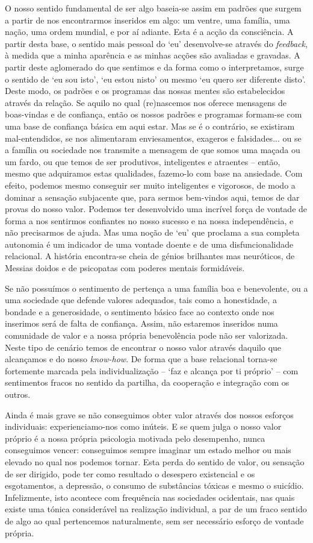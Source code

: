 O nosso sentido fundamental de ser algo baseia-se assim em padrões que surgem a partir de nos encontrarmos inseridos em algo: um ventre, uma família, uma nação, uma ordem mundial, e por aí adiante. Esta é a acção da consciência. A partir desta base, o sentido mais pessoal do `eu' desenvolve-se através do \emph{feedback}, à medida que a minha aparência e as minhas acções são avaliadas e gravadas. A partir deste aglomerado do que sentimos e da forma como o interpretamos, surge o sentido de `eu sou isto', `eu estou nisto' ou mesmo `eu quero ser diferente disto'. Deste modo, os padrões e os programas das nossas mentes são estabelecidos através da relação. Se aquilo no qual (re)nascemos nos oferece mensagens de boas-vindas e de confiança, então os nossos padrões e programas formam-se com uma base de confiança básica em aqui estar. Mas se é o contrário, se existiram mal-entendidos, se nos alimentaram enviesamentos, exageros e falsidades... ou se a família ou sociedade nos transmite a mensagem de que somos uma maçada ou um fardo, ou que temos de ser produtivos, inteligentes e atraentes -- então, mesmo que adquiramos estas qualidades, fazemo-lo com base na ansiedade. Com efeito, podemos mesmo conseguir ser muito inteligentes e vigorosos, de modo a dominar a sensação subjacente que, para sermos bem-vindos aqui, temos de dar provas do nosso valor. Podemos ter desenvolvido uma incrível força de vontade de forma a nos sentirmos confiantes no nosso sucesso e na nossa independência, e não precisarmos de ajuda. Mas uma noção de `eu' que proclama a sua completa autonomia é um indicador de uma vontade doente e de uma disfuncionalidade relacional. A história encontra-se cheia de génios brilhantes mas neuróticos, de Messias doidos e de psicopatas com poderes mentais formidáveis.

Se não possuímos o sentimento de pertença a uma família boa e benevolente, ou a uma sociedade que defende valores adequados, tais como a honestidade, a bondade e a generosidade, o sentimento básico face ao contexto onde nos inserimos será de falta de confiança. Assim, não estaremos inseridos numa comunidade de valor e a nossa própria benevolência pode não ser valorizada. Neste tipo de cenário temos de encontrar o nosso valor através daquilo que alcançamos e do nosso \emph{know-how}. De forma que a base relacional torna-se fortemente marcada pela individualização -- `faz e alcança por ti próprio' -- com sentimentos fracos no sentido da partilha, da cooperação e integração com os outros.

Ainda é mais grave se não conseguimos obter valor através dos nossos esforços individuais: experienciamo-nos como inúteis. E se quem julga o nosso valor próprio é a nossa própria psicologia motivada pelo desempenho, nunca conseguimos vencer: conseguimos sempre imaginar um estado melhor ou mais elevado no qual nos podemos tornar. Esta perda do sentido de valor, ou sensação de ser dirigido, pode ter como resultado o desespero existencial e os esgotamentos, a depressão, o consumo de substâncias tóxicas e mesmo o suicídio. Infelizmente, isto acontece com frequência nas sociedades ocidentais, nas quais existe uma tónica considerável na realização individual, a par de um fraco sentido de algo ao qual pertencemos naturalmente, sem ser necessário esforço de vontade própria.


